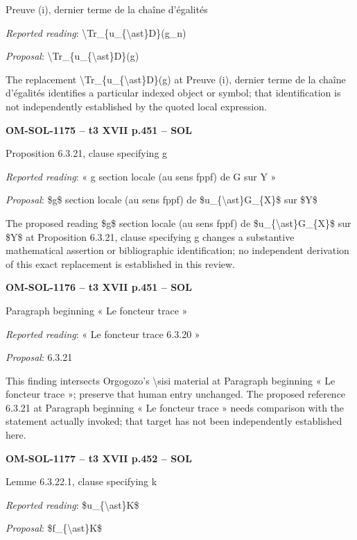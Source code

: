 Preuve (i), dernier terme de la chaîne d'égalités\par
\emph{Reported reading}: \textbackslash{}Tr\_\{u\_\{\textbackslash{}ast\}D\}(g\_n)\par
\emph{Proposal}: \textbackslash{}Tr\_\{u\_\{\textbackslash{}ast\}D\}(g)\par
The replacement \textbackslash{}Tr\_\{u\_\{\textbackslash{}ast\}D\}(g) at Preuve (i), dernier terme de la chaîne d'égalités identifies a particular indexed object or symbol; that identification is not independently established by the quoted local expression.\par
\par\noindent\textbf{OM-SOL-1175 -- t3 XVII p.451 -- SOL}\par
Proposition 6.3.21, clause specifying g\par
\emph{Reported reading}: « g section locale (au sens fppf) de G sur Y »\par
\emph{Proposal}: \$g\$ section locale (au sens fppf) de \$u\_\{\textbackslash{}ast\}G\_\{X\}\$ sur \$Y\$\par
The proposed reading \$g\$ section locale (au sens fppf) de \$u\_\{\textbackslash{}ast\}G\_\{X\}\$ sur \$Y\$ at Proposition 6.3.21, clause specifying g changes a substantive mathematical assertion or bibliographic identification; no independent derivation of this exact replacement is established in this review.\par
\par\noindent\textbf{OM-SOL-1176 -- t3 XVII p.451 -- SOL}\par
Paragraph beginning « Le foncteur trace »\par
\emph{Reported reading}: « Le foncteur trace 6.3.20 »\par
\emph{Proposal}: 6.3.21\par
This finding intersects Orgogozo's \textbackslash{}sisi material at Paragraph beginning « Le foncteur trace »; preserve that human entry unchanged. The proposed reference 6.3.21 at Paragraph beginning « Le foncteur trace » needs comparison with the statement actually invoked; that target has not been independently established here.\par
\par\noindent\textbf{OM-SOL-1177 -- t3 XVII p.452 -- SOL}\par
Lemme 6.3.22.1, clause specifying k\par
\emph{Reported reading}: \$u\_\{\textbackslash{}ast\}K\$\par
\emph{Proposal}: \$f\_\{\textbackslash{}ast\}K\$\par
